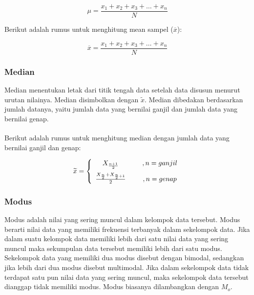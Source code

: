 \begin{equation}
\mu = \frac{x_1+x_2+x_3+\ldots+x_n}{N}
\end{equation}

\noindent Berikut adalah rumus untuk menghitung mean sampel ($\overline{x}$):

\begin{equation}
\overline{x} = \frac{x_1+x_2+x_3+\ldots+x_n}{N}
\end{equation}


\subsubsection{Median}
Median menentukan letak dari titik tengah data setelah data disusun menurut urutan nilainya. Median disimbolkan dengan $\widetilde x$. Median dibedakan  berdasarkan jumlah datanya, yaitu jumlah data yang bernilai ganjil dan jumlah data yang bernilai genap. 
\\\\
\noindent Berikut adalah rumus untuk menghitung median dengan jumlah data yang bernilai ganjil dan genap:

\begin{align}
\widetilde x = 
\left\{ \begin{array}{cc} 
X_{\frac{n+1}{2}} & \hspace{5mm} ,n=ganjil \vspace{2mm}\\
\frac{X_{\frac{n}{2}}+X_{\frac{n}{2}+1}}{2}  & \hspace{5mm} ,n=genap \\
 \end{array} 
 \right.
\end{align}

\subsubsection{Modus}
Modus adalah nilai yang sering muncul dalam kelompok data tersebut. Modus berarti nilai data yang memiliki frekuensi terbanyak dalam sekelompok data. Jika dalam suatu kelompok data memiliki lebih dari satu nilai data yang sering muncul maka sekumpulan data tersebut memiliki lebih dari satu modus. Sekelompok data yang memiliki dua modus disebut dengan bimodal, sedangkan jika lebih dari dua modus disebut multimodal. Jika dalam sekelompok data tidak terdapat satu pun nilai data yang sering muncul, maka sekelompok data tersebut dianggap tidak memiliki modus. Modus biasanya dilambangkan dengan $M_o$.



